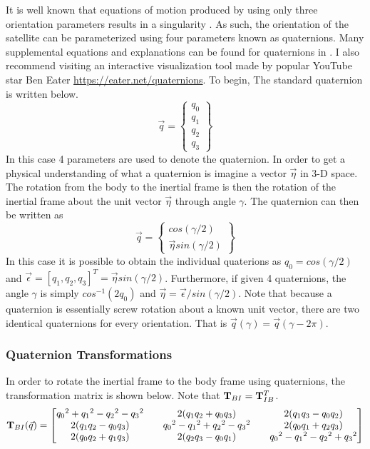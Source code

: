 \documentclass{article}
\begin{document}
It is well known that equations of motion produced by using only three
orientation parameters results in a singularity \cite{etkins}. As
such, the orientation of the satellite can be parameterized using four
parameters known as quaternions. Many supplemental equations and
explanations can be found for quaternions in
\cite{Lin,Filipe,multibody,quaternions,cassidis,Munoz,Markley,Liu_Estimation}. I
also recommend visiting an interactive visualization tool made by
popular YouTube star Ben Eater \url{https://eater.net/quaternions}. To
begin, The standard quaternion is written below.
\begin{equation}
  \vec{q} = \begin{Bmatrix} q_0 \\ q_1 \\ q_2 \\ q_3 \end{Bmatrix}
\end{equation}
In this case 4 parameters are used to denote the quaternion. In order
to get a physical understanding of what a quaternion is imagine a
vector $\vec{\eta}$ in 3-D space. The rotation from the body to the
inertial frame is then the rotation of the inertial frame about the
unit vector $\vec{\eta}$ through angle $\gamma$. The quaternion can
then be written as
\begin{equation}
  \vec{q} = \begin{Bmatrix} cos(\gamma/2)
    \\ \vec{\eta}sin(\gamma/2) \end{Bmatrix}
\end{equation}
In this case it is possible to obtain the individual quaterions as
$q_0 = cos(\gamma/2)$ and $\vec{\epsilon} = [q_1,q_2,q_3]^T =
\vec{\eta}sin(\gamma/2)$. Furthermore, if given 4 quaternions, the
angle $\gamma$ is simply $cos^{-1}(2q_0)$ and
$\vec{\eta}=\vec{\epsilon}/sin(\gamma/2)$. Note that because a quaternion is
essentially screw rotation about a known unit vector, there are two
identical quaternions for every orientation. That is $\vec{q}(\gamma) = \vec{q}(\gamma-2\pi)$.

\subsubsection{Quaternion Transformations}

In order to rotate the inertial frame to the
body frame using quaternions, the transformation matrix is shown
below. Note that ${\bf T}_{BI}={\bf T}_{IB}^T$. 
\begin{equation}
  {\bf T}_{BI}(\vec{q}) = \begin{bmatrix}
    {q_0}^2 + {q_1}^2 - {q_2}^2 - {q_3}^2 && 2(q_1q_2+q_0q_3) && 2(q_1q_3-q_0q_2)\\
    2(q_1q_2-q_0q_3) && {q_0}^2 - {q_1}^2 + {q_2}^2 - {q_3}^2 && 2(q_0q_1+q_2q_3)\\
    2(q_0q_2+q_1q_3) && 2(q_2q_3-q_0q_1) && {q_0}^2 - {q_1}^2 - {q_2}^2 + {q_3}^2
  \end{bmatrix}
\end{equation}
\end{document}
